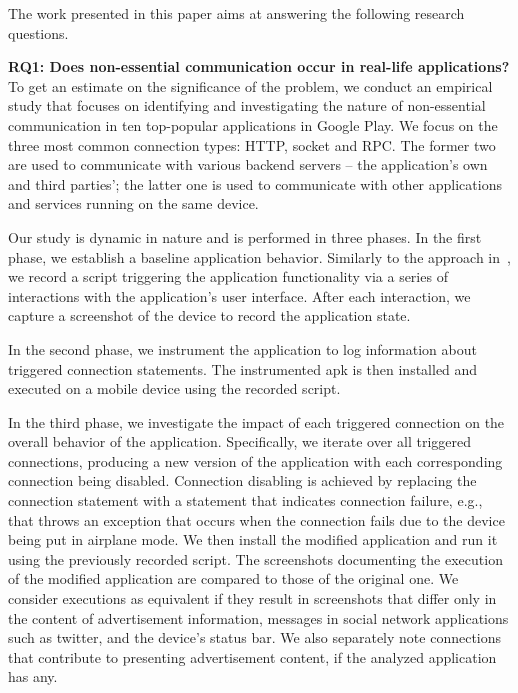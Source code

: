 The work presented in this paper aims at answering the following research questions.

\vspace{0.1in}
\noindent 
{\bf RQ1: Does non-essential communication occur in real-life applications?}
To get an  estimate on the significance of the problem, we conduct an empirical study 
that focuses on identifying and investigating the nature of non-essential communication in ten top-popular applications in Google Play. 
We focus on the three most common connection types: HTTP, socket and RPC.
The former two are used to communicate with various backend servers -- the application's own and third parties'; 
the latter one is used to communicate with other applications and services running on the same device.

Our study is dynamic in nature and is performed in three phases. 
In the first phase, we establish a baseline application behavior. 
Similarly to the approach in~\cite{Hornyack:Han:Jung:Schechter:Wetherall:CCS11}, we record a script triggering the application functionality via a series of interactions with the application's user interface. 
After each interaction, we capture a screenshot of the device to record the application state. 

In the second phase, we instrument the application to log information about 
triggered connection statements. The instrumented apk is then installed and executed on a mobile device using the recorded script. 

In the third phase, we investigate the impact of each triggered connection on the overall behavior of the application.
Specifically, we iterate over all triggered connections, producing a new version of the application with each corresponding connection being disabled. Connection disabling is achieved by replacing the connection statement with a
statement that indicates connection failure, e.g., that throws an exception that occurs when the connection fails due to the device being put in airplane mode. 
We then install the modified application and run it using the previously recorded script. The screenshots documenting 
the execution of the modified application are compared to those of the original one. We consider executions as equivalent if they result in screenshots that differ only in the content of advertisement information, messages in social network applications such as twitter, and the device's status bar. 
We also separately note connections that contribute to presenting advertisement content, if the analyzed application has any. 

